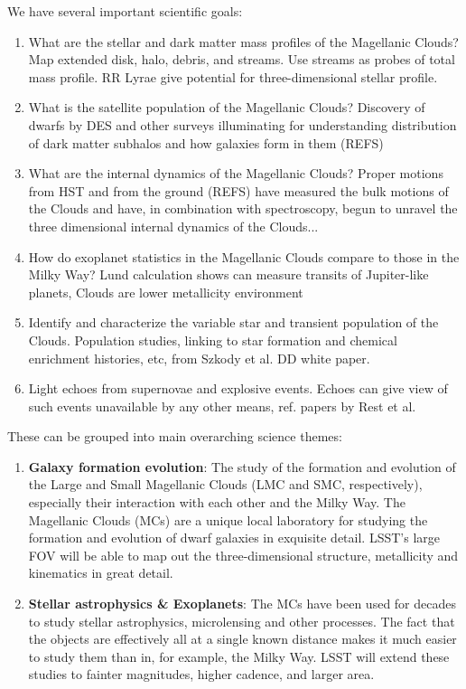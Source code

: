 We have several important scientific goals:
\begin{enumerate}

\item What are the stellar and dark matter mass profiles of the
Magellanic Clouds?  Map extended disk, halo, debris, and streams.  Use
streams as probes of total mass profile.  RR Lyrae give potential for
three-dimensional stellar profile.

\item What is the satellite population of the Magellanic Clouds?
Discovery of dwarfs by DES and other surveys illuminating for
understanding distribution of dark matter subhalos and how galaxies
form in them (REFS)

\item What are the internal dynamics of the Magellanic Clouds?  Proper
motions from HST and from the ground (REFS) have measured the bulk
motions of the Clouds and have, in combination with spectroscopy,
begun to unravel the three dimensional internal dynamics of the
Clouds...

\item How do exoplanet statistics in the Magellanic Clouds compare to
those in the Milky Way?  Lund calculation shows can measure transits
of Jupiter-like planets, Clouds are lower metallicity environment

\item Identify and characterize the variable star and transient
population of the Clouds.  Population studies, linking to star
formation and chemical enrichment histories, etc, from Szkody et al.
DD white paper.

\item Light echoes from supernovae and explosive events.  Echoes can
give view of such events unavailable by any other means, ref. papers
by Rest et al.
\end{enumerate}

These can be grouped into main overarching science themes:
\begin{enumerate}
\item {\bf Galaxy formation evolution}: The study of the formation and
evolution of the Large and Small Magellanic Clouds (LMC and SMC,
respectively), especially their interaction with each other and the
Milky Way. The Magellanic Clouds (MCs) are a unique local laboratory
for studying the formation and evolution of dwarf galaxies in
exquisite detail.  LSST's large FOV will be able to map out the
three-dimensional structure, metallicity and kinematics in great
detail.
\item {\bf Stellar astrophysics \& Exoplanets}:  The MCs have been
used for decades to study stellar astrophysics, microlensing and other
processes.  The fact that the objects are effectively all at a single
known distance makes it much easier to study them than in, for
example, the Milky Way.  LSST will extend these studies to fainter
magnitudes, higher cadence, and larger area.
\end{enumerate}

